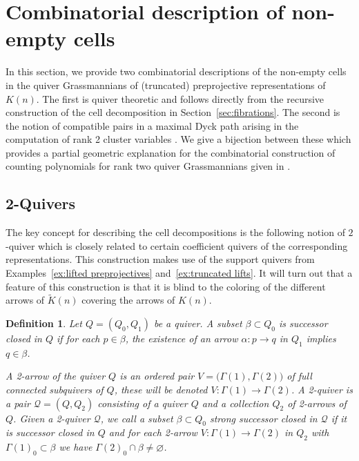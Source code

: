 \documentclass{amsart}
\newtheorem{definition}[theorem]{Definition}
\numberwithin{equation}{section}
\newcommand{\cQ}{\mathcal{Q}}
\begin{document}
\section{Combinatorial description of non-empty cells}\label{sec:combinatorics}
\noindent In this section, we provide two combinatorial descriptions of the non-empty cells in the quiver Grassmannians of (truncated) preprojective representations of $K(n)$.
The first is quiver theoretic and follows directly from the recursive construction of the cell decomposition in Section~\ref{sec:fibrations}.
The second is the notion of compatible pairs in a maximal Dyck path arising in the computation of rank 2 cluster variables \cite{llz}.
We give a bijection between these which provides a partial geometric explanation for the combinatorial construction of counting polynomials for rank two quiver Grassmannians given in \cite{rupel}.

\subsection{2-Quivers}\label{sec:2quivers}

The key concept for describing the cell decompositions is the following notion of $2$-quiver which is closely related to certain coefficient quivers of the corresponding representations.
This construction makes use of the support quivers from Examples~\ref{ex:lifted preprojectives} and~\ref{ex:truncated lifts}.
It will turn out that a feature of this construction is that it is blind to the coloring of the different arrows of $\widetilde K(n)$ covering the arrows of $K(n)$.
\begin{definition}
  Let $Q=(Q_0,Q_1)$ be a quiver.
  A subset $\beta\subset Q_0$ is \emph{successor closed in $Q$} if for each $p\in\beta$, the existence of an arrow $\alpha:p\to q$ in $Q_1$ implies $q\in\beta$.

  A \emph{2-arrow} of the quiver $Q$ is an ordered pair $V=\big(\Gamma(1),\Gamma(2)\big)$ of full connected subquivers of $Q$, these will be denoted $V:\Gamma(1)\to\Gamma(2)$.
  A \emph{2-quiver} is a pair $\cQ=(Q,Q_2)$ consisting of a quiver $Q$ and a collection $Q_2$ of 2-arrows of $Q$.
  Given a 2-quiver $\cQ$, we call a subset $\beta\subset Q_0$ \emph{strong successor closed in $\cQ$} if it is successor closed in $Q$ and for each 2-arrow $V:\Gamma(1)\to\Gamma(2)$ in $Q_2$ with $\Gamma(1)_0\subset\beta$ we have $\Gamma(2)_0\cap\beta\ne\varnothing$.  
\end{definition}
\end{document}
